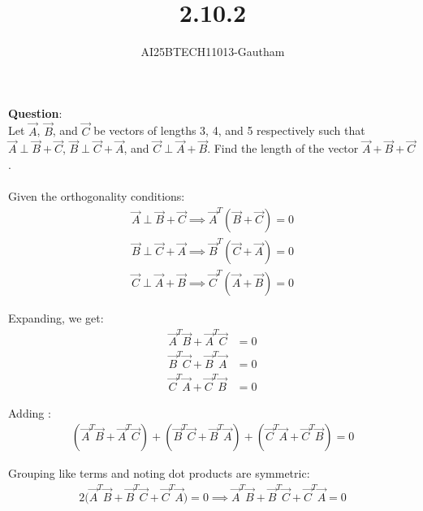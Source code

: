 \documentclass[journal]{IEEEtran}
\begin{document}

\vspace{3cm}

\title{2.10.2}
\author{AI25BTECH11013-Gautham}
 \maketitle
{\let\newpage\relax\maketitle}

\renewcommand{\thefigure}{\theenumi}
\renewcommand{\thetable}{\theenumi}
\setlength{\intextsep}{10pt} %


\renewcommand{\thetable}{\theenumi}  
\textbf{Question}:\\
Let $\Vec{A}$, $\Vec{B}$, and $\Vec{C}$ be vectors of lengths 3, 4, and 5 respectively such that
$\Vec{A} \perp \Vec{B} + \Vec{C}$, 
$\Vec{B} \perp \Vec{C} + \Vec{A}$, and
$\Vec{C} \perp \Vec{A} + \Vec{B}$. Find the length of the vector $\Vec{A} + \Vec{B} + \Vec{C}$.\\

\solution \\


Given the orthogonality conditions:
\begin{align}
\Vec{A} \perp \Vec{B} + \Vec{C} \implies \Vec{A}^T (\Vec{B} + \Vec{C}) = 0 \\
\Vec{B} \perp \Vec{C} + \Vec{A} \implies \Vec{B}^T (\Vec{C} + \Vec{A}) = 0 \\
\Vec{C} \perp \Vec{A} + \Vec{B} \implies \Vec{C}^T (\Vec{A} + \Vec{B}) = 0
\end{align}

Expanding, we get:
\begin{align}
\Vec{A}^T \Vec{B} + \Vec{A}^T \Vec{C} &= 0 \\
\Vec{B}^T \Vec{C} + \Vec{B}^T \Vec{A} &= 0  \\
\Vec{C}^T \Vec{A} + \Vec{C}^T \Vec{B} &= 0 
\end{align}

Adding :
\begin{align}
(\Vec{A}^T \Vec{B} + \Vec{A}^T \Vec{C}) + (\Vec{B}^T \Vec{C} + \Vec{B}^T \Vec{A}) + (\Vec{C}^T \Vec{A} + \Vec{C}^T \Vec{B}) = 0
\end{align}

Grouping like terms and noting dot products are symmetric:
\begin{align}
2 \big( \Vec{A}^T \Vec{B} + \Vec{B}^T \Vec{C} + \Vec{C}^T \Vec{A} \big) = 0 \implies \Vec{A}^T \Vec{B} + \Vec{B}^T \Vec{C} + \Vec{C}^T \Vec{A} = 0
\end{align}
\end{document}
